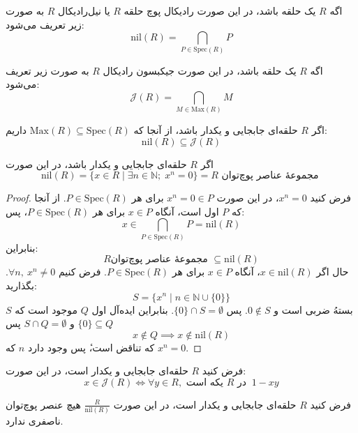 \begin{definition}
    اگه $R$
    یک حلقه باشد، در این صورت
    رادیکال‌ پوچ
    حلقه
    $R$
    یا
    نیل‌رادیکال $R$
    به صورت زیر تعریف می‌شود:
    $$\mathrm{nil}(R) = \bigcap_{P \in \mathrm{Spec}(R)} P$$

\end{definition}

\begin{definition}
    اگه $R$
    یک حلقه باشد، در این صورت
    جیکبسون رادیکال $R$
    به صورت زیر تعریف می‌شود:
    $$\mathcal{J}(R) = \bigcap_{M \in \mathrm{Max}(R)} M$$

\end{definition}

\begin{remark}
    اگر $R$ حلقه‌ای جابجایی و یکدار باشد،
    از آنجا که $\mathrm{Max}(R) \subseteq \mathrm{Spec}(R)$ داریم:
    \[
        \mathrm{nil}(R) \subseteq \mathcal{J}(R)
    \]
\end{remark}

\begin{theorem}
    اگر $R$ حلقه‌ای جابجایی و یکدار باشد، در این صورت
    $$\mathrm{nil}(R) = \{ x \in R \mid \exists n \in \mathbb{N} ; \; x^n = 0 \} = R \text{ مجموعهٔ عناصر پوچ‌توان  } $$

\end{theorem}

\begin{proof}
    فرض کنید $x^n = 0 $، در این صورت
    $x^n = 0 \in P$
    برای هر $P \in \mathrm{Spec}(R)$.
    از آنجا که
    \(P\)
    اول است،
    آنگاه $x \in P$ برای هر $P \in \mathrm{Spec}(R)$، پس:
    \[
        x \in \bigcap_{P \in \mathrm{Spec}(R)} P = \mathrm{nil}(R)
    \]
    بنابراین:
    \[
        R \text{مجموعهٔ عناصر پوچ‌توان } \subseteq \mathrm{nil}(R)
    \]
    حال
    اگر $x \in \mathrm{nil}(R)$، آنگاه $x \in P$ برای هر $P \in \mathrm{Spec}(R)$.
    فرض کنیم $\forall n,\ x^n \ne 0$.
    بگذارید:
    \[
        S = \{x^n \mid n \in \mathbb{N} \cup \{0\} \}
    \]
    $S$
    بستهُ ضربی است و
    $0 \notin S$.
    پس
    \(\{0\} \cap S = \emptyset\). بنابراین ایده‌آل اول
    $Q$
    موجود است که
    \(\{0\} \subseteq Q\)
    و
    $S \cap Q = \emptyset$
    پس
    \[
        x \notin Q \implies x \notin \mathrm{nil}(R)
    \]
    که تناقض است،ٔ پس وجود دارد \(n\) که \(x^n = 0\).

\end{proof}

\begin{assignment}
    فرض کنید
    \(R\)
    حلقه‌ای جابجایی و یکدار است، در این صورت:
    $$x \in \mathcal{J}(R) \iff \forall y \in R, \text{ یکه است } R \text{ در } \ 1 - xy  $$
\end{assignment}

\begin{assignment}
    فرض کنید
    \(R\)
    حلقه‌ای جابجایی و یکدار است، در این صورت
    \(\frac{R}{\mathrm{nil}(R)}\)
    هیچ عنصر پوچ‌توان ناصفری ندارد.
\end{assignment}